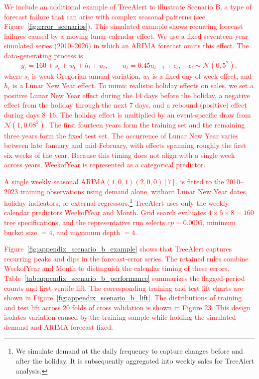 \documentclass[12pt]{article}
\newcommand{\matt}[1]{\textcolor{red}{#1}}
\begin{document}
\matt{We include an additional example of TreeAlert to illustrate Scenario B, a type of forecast failure that can arise with complex seasonal patterns (see Figure~\ref{fig:error_scenarios}). This simulated example shows recurring forecast failures caused by a moving lunar-calendar effect. We use a fixed seventeen-year simulated series (2010--2026) in which an ARIMA forecast omits this effect. The data-generating process is
\begin{equation}
\label{eq:scenario_b_data_generating_process}
y_t=160+s_t+w_t+h_t+u_t, \qquad u_t=0.45u_{t-1}+\epsilon_t, \quad \epsilon_t\sim\mathcal{N}(0,5^2),
\end{equation}
where $s_t$ is weak Gregorian annual variation, $w_t$ is a fixed day-of-week effect, and $h_t$ is a Lunar New Year effect. To mimic realistic holiday effects on sales, we set a positive Lunar New Year effect during the 14 days before the holiday, a negative effect from the holiday through the next 7 days, and a rebound (positive) effect during days 8--16. The holiday effect is multiplied by an event-specific draw from $\mathcal{N}(1,0.08^2)$. The first fourteen years form the training set and the remaining three years form the fixed test set.}
\matt{The occurrence of Lunar New Year varies between late January and mid-February, with effects spanning roughly the first six weeks of the year. Because this timing does not align with a single week across years, WeekofYear is represented as a categorical predictor.}

\matt{A single weekly seasonal ARIMA$(1,0,1)(2,0,0)[7]$, is fitted to the 2010--2023 training observations using demand alone, without Lunar New Year dates, holiday indicators, or external regressors.\footnote{We simulate demand at the daily frequency to capture changes before and after the holiday. It is subsequently aggregated into weekly sales for TreeAlert analysis.} TreeAlert uses only the weekly calendar predictors WeekofYear and Month. Grid search evaluates $4\times5\times8=160$ tree specifications, and the representative run selects $cp=0.0005$, minimum bucket size $=4$, and maximum depth $=4$.}

\matt{Figure~\ref{fig:appendix_scenario_b_example} shows that TreeAlert captures recurring peaks and dips in the forecast-error series. The retained rules combine WeekofYear and Month to distinguish the calendar timing of these errors. Table~\ref{tab:appendix_scenario_b_performance} summarizes the flagged-period counts and first-ventile lift. The corresponding training and test lift charts are shown in Figure~\ref{fig:appendix_scenario_b_lift}. The distributions of training and test lift across 20 folds of cross validation is shown in Figure 23. This design isolates variation caused by the training sample while holding the simulated demand and ARIMA forecast fixed.}
\end{document}
